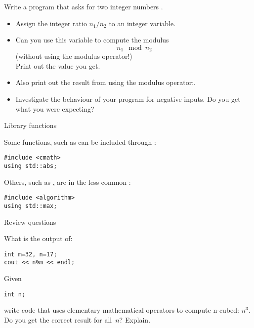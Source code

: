 \begin{exercise}
  \label{ex:modulus}
  Write a program that asks for two integer numbers .
  \begin{itemize}
  \item Assign the integer ratio $n_1/n_2$ to an integer variable.
  \item Can you use this variable to compute the modulus
    \[ n_1\mod n_2 \]
    (without using the  modulus operator!)\\
    Print out the value you get.
  \item Also print out the result from using the modulus
    operator:.
  \item Investigate the behaviour of your program for negative
    inputs. Do you get what you were expecting?
  \end{itemize}
\end{exercise}

 {Library functions}

Some functions, such as  can be included through :
\begin{verbatim}
#include <cmath>
using std::abs;
\end{verbatim}
Others, such as , are in the less common :
\begin{verbatim}
#include <algorithm>
using std::max;
\end{verbatim}

 {Review questions}

\begin{exercise}
  \label{ex:cpp-mod}
What is the output of:
\begin{verbatim}
int m=32, n=17;
cout << n%m << endl;
\end{verbatim}
\end{exercise}

\begin{exercise}
  \label{ex:cpp-cube}
  Given
\begin{verbatim}
int n;
\end{verbatim}
write code that
uses elementary mathematical operators to compute n-cubed: $n^3$.
Do you get the correct result for all~$n$? Explain.
\end{exercise}
